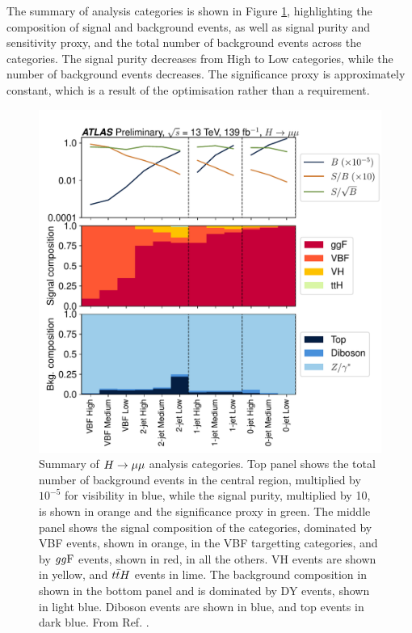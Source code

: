 The summary of analysis categories is shown in Figure \ref{fig:hmumu:cat-summary},
highlighting the composition of signal and background events, as well
as signal purity and sensitivity proxy, and the total number of background
events across the categories. The signal purity decreases from High to
Low categories, while the number of background events decreases. The
significance proxy is approximately constant, which is a result of the 
optimisation rather than a requirement.
\begin{figure}[h!]
  \centering
  \includegraphics[width=1.0\textwidth]{figures/hmumu/cat-summary}
  \caption[Summary of $\hmumu$ analysis categories]{Summary of $\hmumu$
  analysis categories. Top panel shows the total number of background events
  in the central region, multiplied by $10^{-5}$ for visibility in blue,
  while the signal purity, multiplied by 10, is shown in orange and the
  significance proxy in green. The middle panel shows the signal
  composition of the categories, dominated by VBF events, shown in orange,
  in the VBF targetting categories, and by $gg\text{F}$ events, shown in red,
  in all the others. VH events are shown in yellow, and $t\bar{t} H$ events
  in lime. The background composition in shown in the bottom 
  panel and is dominated by DY events, shown in light blue. Diboson events
  are shown in blue, and top events in dark blue. From Ref. \cite{ATLAS-CONF-2019-028}.
  }
  \label{fig:hmumu:cat-summary}
\end{figure}

